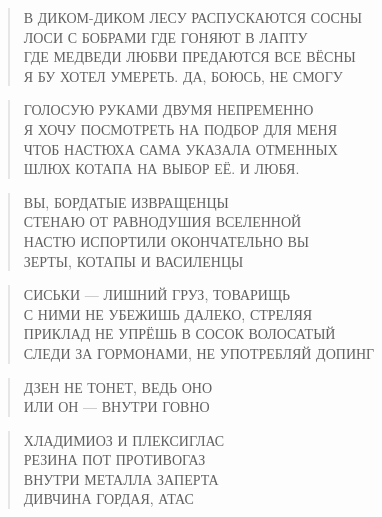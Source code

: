 \poemtitle{***}
\begin{verse}
В ДИКОМ-ДИКОМ ЛЕСУ РАСПУСКАЮТСЯ СОСНЫ\\
ЛОСИ С БОБРАМИ ГДЕ ГОНЯЮТ В ЛАПТУ\\
ГДЕ МЕДВЕДИ ЛЮБВИ ПРЕДАЮТСЯ ВСЕ ВЁСНЫ\\
Я БУ ХОТЕЛ УМЕРЕТЬ. ДА, БОЮСЬ, НЕ СМОГУ
\end{verse}

\poemtitle{***}
\begin{verse}
ГОЛОСУЮ РУКАМИ ДВУМЯ НЕПРЕМЕННО\\
Я ХОЧУ ПОСМОТРЕТЬ НА ПОДБОР ДЛЯ МЕНЯ\\
ЧТОБ НАСТЮХА САМА УКАЗАЛА ОТМЕННЫХ\\
ШЛЮХ КОТАПА НА ВЫБОР ЕЁ. И ЛЮБЯ.
\end{verse}

\poemtitle{***}
\begin{verse}
ВЫ, БОРДАТЫЕ ИЗВРАЩЕНЦЫ\\
СТЕНАЮ ОТ РАВНОДУШИЯ ВСЕЛЕННОЙ\\
НАСТЮ ИСПОРТИЛИ ОКОНЧАТЕЛЬНО ВЫ\\
ЗЕРТЫ, КОТАПЫ И ВАСИЛЕНЦЫ
\end{verse}

\poemtitle{***}
\begin{verse}
СИСЬКИ — ЛИШНИЙ ГРУЗ, ТОВАРИЩЬ\\
С НИМИ НЕ УБЕЖИШЬ ДАЛЕКО, СТРЕЛЯЯ\\
ПРИКЛАД НЕ УПРЁШЬ В СОСОК ВОЛОСАТЫЙ\\
СЛЕДИ ЗА ГОРМОНАМИ, НЕ УПОТРЕБЛЯЙ ДОПИНГ
\end{verse}

\poemtitle{***}
\begin{verse}
ДЗЕН НЕ ТОНЕТ, ВЕДЬ ОНО\\
ИЛИ ОН — ВНУТРИ ГОВНО
\end{verse}

\poemtitle{***}
\begin{verse}
ХЛАДИМИОЗ И ПЛЕКСИГЛАС\\
РЕЗИНА ПОТ ПРОТИВОГАЗ\\
ВНУТРИ МЕТАЛЛА ЗАПЕРТА\\
ДИВЧИНА ГОРДАЯ, АТАС
\end{verse}

